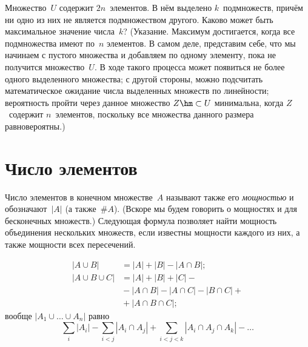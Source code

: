 \begin{problem}
        \label{noncomparable-subsets}%
Множество~$U$ содержит $2n$~элементов. В нём выделено $k$~подмножеств,
причём ни одно из них не является подмножеством
другого. Каково может быть максимальное значение числа~$k$?
(Указание. Максимум достигается, когда все подмножества имеют
по~$n$ элементов. В самом деле, представим себе, что мы начинаем
с пустого множества и добавляем по одному элементу, пока не получится
множество~$U$. В ходе такого процесса может появиться не
более одного выделенного множества; с другой стороны, можно
подсчитать математическое ожидание числа выделенных множеств по
линейности; вероятность пройти через данное множество
$Z\hm\subset U$ минимальна, когда $Z$~содержит $n$~элементов,
поскольку все множества данного размера равновероятны.)
\end{problem}

\section{Число элементов}
        \label{number-of-elements}

Число элементов в конечном
множестве~$A$ называют также его
\emph{мощностью}
и обозначают~$|A|$ (а также~$\#A$). (Вскоре мы
будем говорить о мощностях и для бесконечных множеств.)
Следующая формула позволяет найти мощность объединения
нескольких множеств, если известны мощности каждого из них, а
также мощности всех пересечений.
\begin{theorem}%
\begin{align*}
    |A\cup B|        & =|A|+|B|-|A\cap B|;\\
    |A\cup B \cup C| & =|A|+|B|+|C|-\\
                     &{}-|A\cap B|-|A\cap C|-|B\cap C|+\\
                     &{}+|A\cap B\cap C|;
\end{align*}
вообще $|A_1\cup\ldots\cup A_n|$ равно
        $$
      \sum_{i}|A_i| - \sum_{i<j}|A_i \cap A_j| +
      \sum_{i<j<k} |A_i \cap A_j \cap A_k| - \ldots
        $$
\end{theorem}

